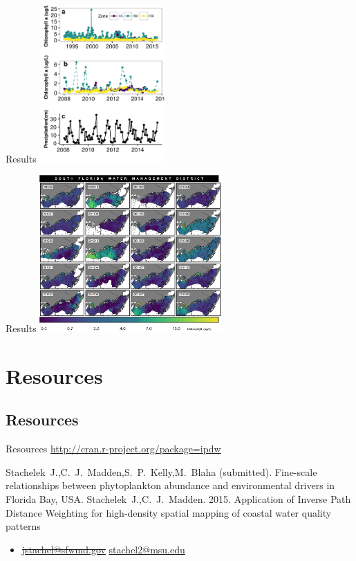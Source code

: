 \documentclass[compress,noflama,nosectionpages]{beamer}
\begin{document}
		\begin{frame}{Results}
			\includegraphics[height=6cm,keepaspectratio=true]{figures/chltimeseries.png}\\
		\end{frame}

		\begin{frame}{Results}
			\includegraphics[height=6cm,keepaspectratio=true]{figures/multipanel.png}\\
		\end{frame}

\section{Resources}
\subsection{Resources}
\begin{frame}{Resources}
  \centering
  \url{http://cran.r-project.org/package=ipdw}
  \begin{thebibliography}{10}
  \beamertemplatearticlebibitems
	Stachelek~J.,C.~J.~Madden,S.~P.~Kelly,M.~Blaha (submitted). Fine-scale relationships between phytoplankton abundance and environmental drivers in Florida Bay, USA.
	\newblock {}
	Stachelek~J.,C.~J.~Madden. 2015. Application of Inverse Path Distance Weighting for high-density spatial mapping of coastal water quality patterns
	\newblock {}
  \end{thebibliography}

	\begin{itemize}
		\item \sout{\url{jstachel@sfwmd.gov}} \url{stachel2@msu.edu}
	\end{itemize}
\end{frame}
\end{document}
